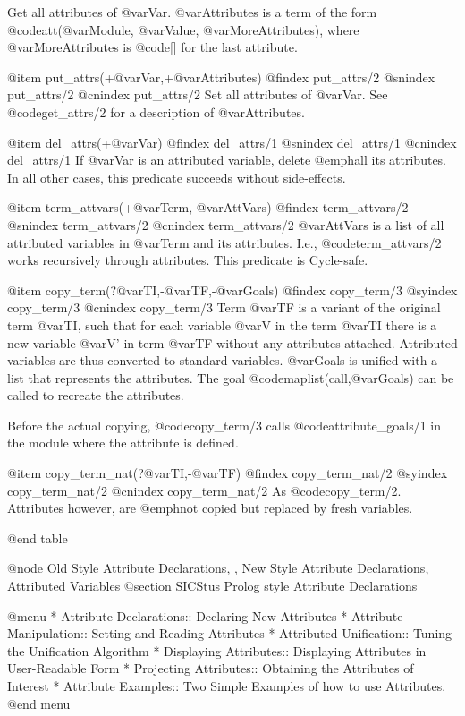 {{{{{{{{Get all attributes of @var{Var}. @var{Attributes} is a term of the form
@code{att(@var{Module}, @var{Value}, @var{MoreAttributes})}, where @var{MoreAttributes} is
@code{[]} for the last attribute.

@item put_attrs(+@var{Var},+@var{Attributes})
@findex put_attrs/2
@snindex put_attrs/2
@cnindex put_attrs/2
Set all attributes of @var{Var}.  See @code{get_attrs/2} for a description of
@var{Attributes}.

@item del_attrs(+@var{Var})
@findex del_attrs/1
@snindex del_attrs/1
@cnindex del_attrs/1
If @var{Var} is an attributed variable, delete @emph{all} its
attributes.  In all other cases, this predicate succeeds without
side-effects.

@item term_attvars(+@var{Term},-@var{AttVars})
@findex term_attvars/2
@snindex term_attvars/2
@cnindex term_attvars/2
@var{AttVars} is a list of all attributed variables in @var{Term} and
its attributes. I.e., @code{term_attvars/2} works recursively through
attributes.  This predicate is Cycle-safe.

@item copy_term(?@var{TI},-@var{TF},-@var{Goals}) 
@findex copy_term/3
@syindex copy_term/3
@cnindex copy_term/3
Term @var{TF} is a variant of the original term @var{TI}, such that for
each variable @var{V} in the term @var{TI} there is a new variable @var{V'}
in term @var{TF} without any attributes attached.  Attributed
variables are thus converted to standard variables.  @var{Goals} is
unified with a list that represents the attributes.  The goal
@code{maplist(call,@var{Goals})} can be called to recreate the
attributes.

Before the actual copying, @code{copy_term/3} calls
@code{attribute_goals/1} in the module where the attribute is
defined.

@item copy_term_nat(?@var{TI},-@var{TF}) 
@findex copy_term_nat/2
@syindex copy_term_nat/2
@cnindex copy_term_nat/2
As @code{copy_term/2}.  Attributes however, are @emph{not} copied but replaced
by fresh variables.

@end table

@node Old Style Attribute Declarations, , New Style Attribute Declarations, Attributed Variables
@section SICStus Prolog style Attribute Declarations

@menu
* Attribute Declarations:: Declaring New Attributes
* Attribute Manipulation:: Setting and Reading Attributes
* Attributed Unification:: Tuning the Unification Algorithm
* Displaying Attributes:: Displaying Attributes in User-Readable Form
* Projecting Attributes:: Obtaining the Attributes of Interest
* Attribute Examples:: Two Simple Examples of how to use Attributes.
@end menu

}}}}}}}}
